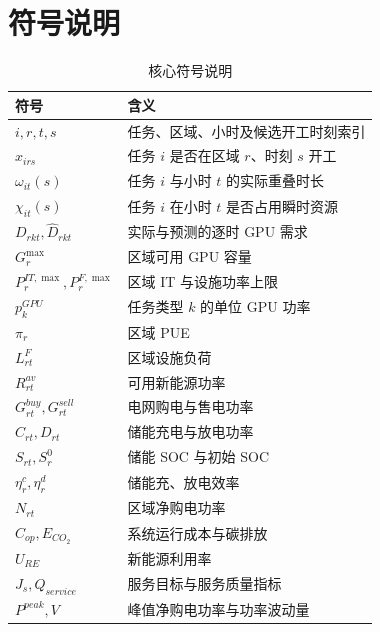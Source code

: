 \section{符号说明}

\begin{table}[H]\centering
\fontsize{8}{9}\selectfont
\renewcommand{\arraystretch}{0.88}
\caption{核心符号说明}\label{tab:symbols}
\begin{tabular}{p{}p{}}
\toprule
符号 & 含义\\
\midrule
$i,r,t,s$ & 任务、区域、小时及候选开工时刻索引\\
$x_{irs}$ & 任务 $i$ 是否在区域 $r$、时刻 $s$ 开工\\
$\omega_{it}(s)$ & 任务 $i$ 与小时 $t$ 的实际重叠时长\\
$\chi_{it}(s)$ & 任务 $i$ 在小时 $t$ 是否占用瞬时资源\\
$D_{rkt},\widehat D_{rkt}$ & 实际与预测的逐时 GPU 需求\\
$G_r^{\max}$ & 区域可用 GPU 容量\\
$P_r^{IT,\max},P_r^{F,\max}$ & 区域 IT 与设施功率上限\\
$p_k^{GPU}$ & 任务类型 $k$ 的单位 GPU 功率\\
$\pi_r$ & 区域 PUE\\
$L_{rt}^{F}$ & 区域设施负荷\\
$R_{rt}^{av}$ & 可用新能源功率\\
$G_{rt}^{buy},G_{rt}^{sell}$ & 电网购电与售电功率\\
$C_{rt},D_{rt}$ & 储能充电与放电功率\\
$S_{rt},S_r^0$ & 储能 SOC 与初始 SOC\\
$\eta_r^c,\eta_r^d$ & 储能充、放电效率\\
$N_{rt}$ & 区域净购电功率\\
$C_{op},E_{CO_2}$ & 系统运行成本与碳排放\\
$U_{RE}$ & 新能源利用率\\
$J_s,Q_{service}$ & 服务目标与服务质量指标\\
$P^{peak},V$ & 峰值净购电功率与功率波动量\\
\bottomrule
\end{tabular}
\end{table}
